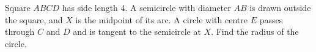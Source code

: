 Square $ABCD$ has side length $4$. A semicircle with diameter $AB$ is drawn outside the square, and $X$ is the midpoint of its arc. A circle with centre $E$ passes through $C$ and $D$ and is tangent to the semicircle at $X$. Find the radius of the circle.
